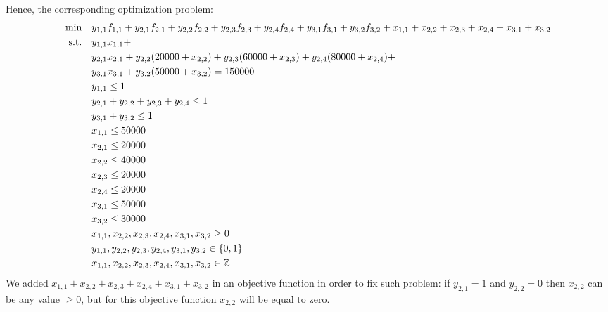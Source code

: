\documentclass{homework}
\begin{document}
Hence, the corresponding optimization problem:
\begin{align*}
	\text{min} \quad
	&y_{1,1}f_{1, 1} + y_{2,1}f_{2, 1}+ y_{2,2}f_{2, 2}+ y_{2,3}f_{2, 3}+ y_{2,4}f_{2, 4}+ y_{3,1}f_{3, 1}+ y_{3,2}f_{3, 2}+x_{1,1} +x_{2,2}+x_{2,3}+x_{2,4}+x_{3,1}+x_{3,2} \\
	\text{s.t.} \quad
	&y_{1,1}x_{1,1}+\\ 
	&y_{2,1}x_{2,1}+ y_{2,2}(20000+x_{2,2})+y_{2,3}(60000+x_{2,3})+y_{2,4}(80000+x_{2,4})+\\
	&y_{3,1}x_{3,1}+y_{3,2}(50000+x_{3,2}) = 150000 \\
	&y_{1,1}\leq1 \\
	&y_{2,1} +y_{2,2} +y_{2,3} +y_{2,4}\leq1 \\
	&y_{3,1} +y_{3,2}\leq1 \\
	&x_{1,1} \leq 50000 \\
	&x_{2,1} \leq 20000 \\
	&x_{2,2} \leq 40000 \\
	&x_{2,3} \leq 20000 \\
	&x_{2,4} \leq 20000 \\
	&x_{3,1} \leq 50000 \\
	&x_{3,2} \leq 30000 \\
	&x_{1,1},x_{2,2},x_{2,3},x_{2,4},x_{3,1},x_{3,2} \geq 0 \\
	&y_{1,1},y_{2,2},y_{2,3},y_{2,4},y_{3,1},y_{3,2} \in \{0, 1\} \\
	&x_{1,1},x_{2,2},x_{2,3},x_{2,4},x_{3,1},x_{3,2} \in \mathbb Z
\end{align*}
We added $x_{1,1} +x_{2,2}+x_{2,3}+x_{2,4}+x_{3,1}+x_{3,2}$ in an objective function in order to fix such problem: if $y_{2,1} = 1$ and $y_{2,2} = 0$ then $x_{2,2}$ can be any value $\geq 0$, but for this objective function $x_{2,2}$ will be equal to zero.
\end{document}

